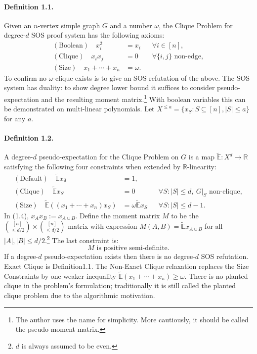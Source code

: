 \documentclass[10pt,a4paper]{article}
\begin{document}
\paragraph{Definition 1.1.} Given an $n$-vertex simple graph $G$ and a number $\omega$, the Clique Problem for degree-$d$ SOS proof system has the following axioms:
\begin{align*}(\text{Boolean})\quad x_i^2&=x_i&&\forall i\in[n],\\(\text{Clique})\quad x_ix_j&=0&&\forall\{i,j\}\text{ non-edge},\\(\text{Size})\quad x_1+\cdots+x_n&=\omega.&&\tag{1.1}\end{align*}
To confirm no $\omega$-clique exists is to give an SOS refutation of the above. The SOS system has duality: to show degree lower bound it suffices to consider pseudo-expectation and the resulting moment matrix.\footnote{The author uses the name for simplicity. More cautiously, it should be called the pseudo-moment matrix.} With boolean variables this can be demonstrated on multi-linear polynomials. Let $X^{\le a}=\{x_S:S\subseteq[n],|S|\le a\}$ for any $a$.
\paragraph{Definition 1.2.} A degree-$d$ pseudo-expectation for the Clique Problem on $G$ is a map $\widetilde{\mathbb E}:X^d\to\mathbb R$ satisfying the following four constraints when extended by $\mathbb R$-linearity:
\begin{align*}(\text{Default})\quad\widetilde{\mathbb E}x_\emptyset&=1,\tag{1.2}\\(\text{Clique})\quad\widetilde{\mathbb E}x_S&=0&&\forall S:|S|\le d,\ G|_S\text{ non-clique},\tag{1.3}\\(\text{Size})\quad\widetilde{\mathbb E}((x_1+\cdots+x_n)x_S)&=\omega\widetilde{\mathbb E}x_S&&\forall S:|S|\le d-1.\tag{1.4}\end{align*}
In (1.4), $x_Ax_B:=x_{A\cup B}$. Define the moment matrix $M$ to be the $\binom{[n]}{\le d/2}\times\binom{[n]}{\le d/2}$ matrix with expression $M(A,B)=\widetilde{\mathbb E}x_{A\cup B}$ for all $|A|,|B|\le d/2$.\footnote{$d$ is always assumed to be even.} The last constraint is:\[M\text{ is positive semi-definite}.\tag{1.5}\]
If a degree-$d$ pseudo-expectation exists then there is no degree-$d$ SOS refutation. Exact Clique is Definition1.1. The Non-Exact Clique relaxation replaces the Size Constraints by one weaker inequality $\widetilde{\mathbb E}(x_1+\cdots+x_n)\ge\omega$. There is no planted clique in the problem's formulation; traditionally it is still called the planted clique problem due to the algorithmic motivation.
\end{document}
